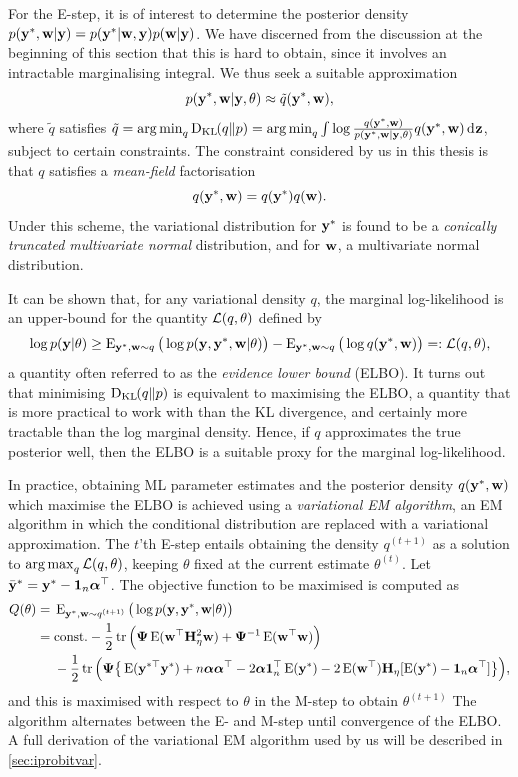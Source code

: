 For the E-step, it is of interest to determine the posterior density $p({\mathbf y}^*,{\mathbf w}|{\mathbf y}) = p({\mathbf y}^*|{\mathbf w},{\mathbf y})p({\mathbf w}|{\mathbf y})$. 
We have discerned from the discussion at the beginning of this section that this is hard to obtain, since it involves an intractable marginalising integral.
We thus seek a suitable approximation
\[
  p({\mathbf y}^*,{\mathbf w} | {\mathbf y}, \theta) \approx \tilde q({\mathbf y}^*,{\mathbf w}),
\]
where $\tilde q$ satisfies $\tilde q = \operatorname*{arg\,min}_q \operatorname{D_{KL}\hspace{-1pt}}(q\Vert p) = \operatorname*{arg\,min}_q \int \log \frac{q({\mathbf y}^*,{\mathbf w})}{p({\mathbf y}^*,{\mathbf w} | {\mathbf y}, \theta)} q({\mathbf y}^*,{\mathbf w}) \operatorname{d}\hspace{0.5pt}\!{\mathbf z}$, subject to certain constraints.
The constraint considered by us in this thesis is that $q$ satisfies a \emph{mean-field} factorisation
\[
  q({\mathbf y}^*,{\mathbf w}) = q({\mathbf y}^*)q({\mathbf w}).
\]
Under this scheme, the variational distribution for ${\mathbf y}^*$ is found to be a \emph{conically truncated multivariate normal} distribution, and for ${\mathbf w}$, a multivariate normal distribution.

It can be shown that, for any variational density $q$, the marginal log-likelihood is an upper-bound for the quantity ${\mathcal L}(q,\theta)$ defined by
\[
  \log p({\mathbf y}|\theta) \geq 
    \operatorname{E}_{{\mathbf y}^*,{\mathbf w}\sim q} \big( \log p({\mathbf y},{\mathbf y}^*,{\mathbf w}|\theta)\big)
    - \operatorname{E}_{{\mathbf y}^*,{\mathbf w}\sim q} \big( \log  q({\mathbf y}^*,{\mathbf w}) \big) =: {\mathcal L}(q,\theta),
\]
a quantity often referred to as the \emph{evidence lower bound} (ELBO).
It turns out that minimising $\operatorname{D_{KL}\hspace{-1pt}}(q\Vert p)$ is equivalent to maximising the ELBO, a quantity that is more practical to work with than the KL divergence, and certainly more tractable than the log marginal density.
Hence, if $q$ approximates the true posterior well, then the ELBO is a suitable proxy for the marginal log-likelihood.

In practice, obtaining ML parameter estimates and the posterior density $q({\mathbf y}^*,{\mathbf w})$ which maximise the ELBO is achieved using a \emph{variational EM algorithm}, an EM algorithm in which the conditional distribution are replaced with a variational approximation.
The $t$'th E-step entails obtaining the density $q^{(t+1)}$ as a solution to $\operatorname*{arg\,max}_q {\mathcal L}(q,\theta)$, keeping $\theta$ fixed at the current estimate $\theta^{(t)}$.
Let $\bar{{\mathbf y}}^* = {\mathbf y}^* - {\mathbf 1}_n{\bm\alpha}^\top$.
The objective function to be maximised is computed as
\begin{align}
  Q(\theta) 
  ={}& \operatorname{E}_{{\mathbf y}^*,{\mathbf w}\sim q^{(t+1)}}  \big( \log p({\mathbf y},{\mathbf y}^*,{\mathbf w}|\theta) \big) \nonumber \\
  ={}& \text{const.}\hspace{0.01em} -\frac{1}{2}\operatorname{tr}\Big( {\bm\Psi} \operatorname{E}({\mathbf w}^\top{\mathbf H}_\eta^2{\mathbf w})  + {\bm\Psi}^{-1} \operatorname{E}({\mathbf w}^\top{\mathbf w}) \Big)  \nonumber \\
  &- \frac{1}{2} \operatorname{tr} \Big( 
  {\bm\Psi} \big\{
  \operatorname{E}({\mathbf y}^{*\top}{\mathbf y}^*)
  + n {\bm\alpha}{\bm\alpha}^\top 
  - 2{\bm\alpha} {\mathbf 1}_n^\top \operatorname{E}({\mathbf y}^*)
  - 2\operatorname{E}({\mathbf w}^\top){\mathbf H}_\eta [\operatorname{E}({\mathbf y}^*) - {\mathbf 1}_n{\bm\alpha}^\top] 
  \big\} \Big) \label{eq:iprobitQEstep}
  ,
\end{align}
and this is maximised with respect to $\theta$ in the M-step to obtain $\theta^{(t+1)}$
The algorithm alternates between the E- and M-step until convergence of the ELBO.
A full derivation of the variational EM algorithm used by us will be described in \cref{sec:iprobitvar}.

